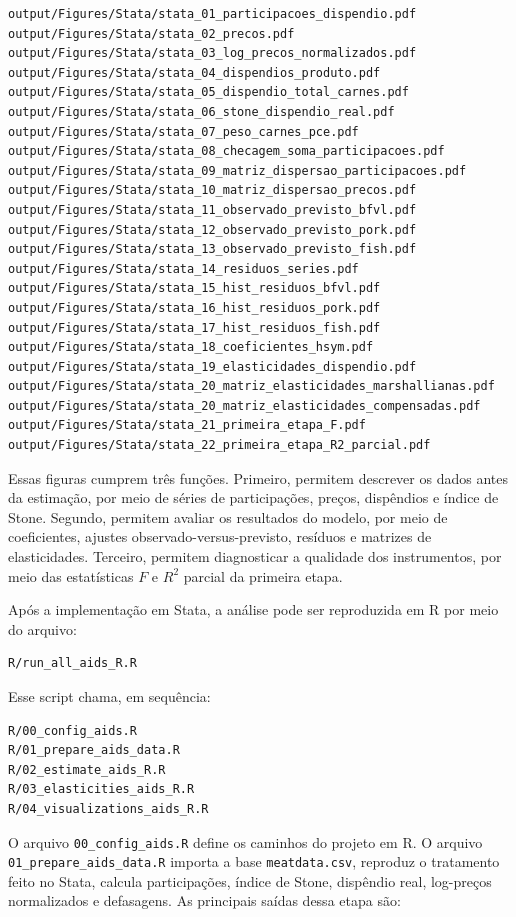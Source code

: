 \documentclass[12pt,a4paper]{article}
\begin{document}
\begin{verbatim}
output/Figures/Stata/stata_01_participacoes_dispendio.pdf
output/Figures/Stata/stata_02_precos.pdf
output/Figures/Stata/stata_03_log_precos_normalizados.pdf
output/Figures/Stata/stata_04_dispendios_produto.pdf
output/Figures/Stata/stata_05_dispendio_total_carnes.pdf
output/Figures/Stata/stata_06_stone_dispendio_real.pdf
output/Figures/Stata/stata_07_peso_carnes_pce.pdf
output/Figures/Stata/stata_08_checagem_soma_participacoes.pdf
output/Figures/Stata/stata_09_matriz_dispersao_participacoes.pdf
output/Figures/Stata/stata_10_matriz_dispersao_precos.pdf
output/Figures/Stata/stata_11_observado_previsto_bfvl.pdf
output/Figures/Stata/stata_12_observado_previsto_pork.pdf
output/Figures/Stata/stata_13_observado_previsto_fish.pdf
output/Figures/Stata/stata_14_residuos_series.pdf
output/Figures/Stata/stata_15_hist_residuos_bfvl.pdf
output/Figures/Stata/stata_16_hist_residuos_pork.pdf
output/Figures/Stata/stata_17_hist_residuos_fish.pdf
output/Figures/Stata/stata_18_coeficientes_hsym.pdf
output/Figures/Stata/stata_19_elasticidades_dispendio.pdf
output/Figures/Stata/stata_20_matriz_elasticidades_marshallianas.pdf
output/Figures/Stata/stata_20_matriz_elasticidades_compensadas.pdf
output/Figures/Stata/stata_21_primeira_etapa_F.pdf
output/Figures/Stata/stata_22_primeira_etapa_R2_parcial.pdf
\end{verbatim}

Essas figuras cumprem três funções. Primeiro, permitem descrever os dados antes da estimação, por meio de séries de participações, preços, dispêndios e índice de Stone. Segundo, permitem avaliar os resultados do modelo, por meio de coeficientes, ajustes observado-versus-previsto, resíduos e matrizes de elasticidades. Terceiro, permitem diagnosticar a qualidade dos instrumentos, por meio das estatísticas \(F\) e \(R^2\) parcial da primeira etapa.

Após a implementação em Stata, a análise pode ser reproduzida em R por meio do arquivo:

\begin{verbatim}
R/run_all_aids_R.R
\end{verbatim}

Esse script chama, em sequência:

\begin{verbatim}
R/00_config_aids.R
R/01_prepare_aids_data.R
R/02_estimate_aids_R.R
R/03_elasticities_aids_R.R
R/04_visualizations_aids_R.R
\end{verbatim}

O arquivo \texttt{00\_config\_aids.R} define os caminhos do projeto em R. O arquivo \texttt{01\_prepare\_aids\_data.R} importa a base \texttt{meatdata.csv}, reproduz o tratamento feito no Stata, calcula participações, índice de Stone, dispêndio real, log-preços normalizados e defasagens. As principais saídas dessa etapa são:
\end{document}
